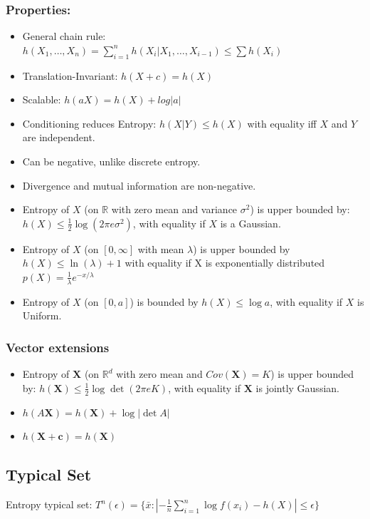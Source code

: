 \documentclass[10pt,a4paper,landscape]{article}
\begin{document}
\begin{multicols*}{4}
\subsubsection{Properties:}
\begin{itemize}
	\item General chain rule: $h(X_1, \ldots, X_n) = \sum_{i=1}^{n} h(X_i|X_1, \ldots, X_{i-1}) \leq \sum h(X_i)$
	\item Translation-Invariant: $h(X + c) = h(X)$
	\item Scalable: $h(aX) = h(X) + log|a|$
	\item Conditioning reduces Entropy: $h(X|Y) \leq h(X)$ with equality iff $X$ and $Y$ are independent.
	\item Can be negative, unlike discrete entropy.
	\item Divergence and mutual information are non-negative.
	\item Entropy of $X$ (on $\mathbb{R}$ with zero mean and variance $\sigma^2$) is upper bounded by: $h(X) \leq \frac{1}{2} \log ( 2\pi e \sigma^2)$, with equality if $X$ is a Gaussian.
	\item Entropy of $X$ (on $[0, \infty]$ with mean $\lambda$) is upper bounded by $h(X) \leq \ln(\lambda) + 1$ with equality if X is exponentially distributed $p(X) = \frac{1}{\lambda} e^{-x/\lambda}$
	\item Entropy of $X$ (on $[0, a]$) is bounded by $h(X) \leq \log a$, with equality if $X$ is Uniform.
\end{itemize}

\subsubsection{Vector extensions}
\begin{itemize}
	\item Entropy of $\boldsymbol X$ (on $\mathbb{R}^d$ with zero mean and $Cov(\boldsymbol X) = K$) is upper bounded by: $h(\boldsymbol X) \leq \frac{1}{2} \log \det (2\pi eK)$, with equality if $\boldsymbol X$ is jointly Gaussian.
	\item $h(A\boldsymbol X) = h(\boldsymbol X) + \log|\det A|$
	\item $h(\boldsymbol X + \boldsymbol c) = h(\boldsymbol X)$
\end{itemize}

\subsection{Typical Set}
Entropy typical set: $T^n(\epsilon) = \{\bar{x}: |-\frac{1}{n}\sum_{i=1}^n \log f(x_i) - h(X)| \leq \epsilon\}$


\end{multicols*}
\end{document}
